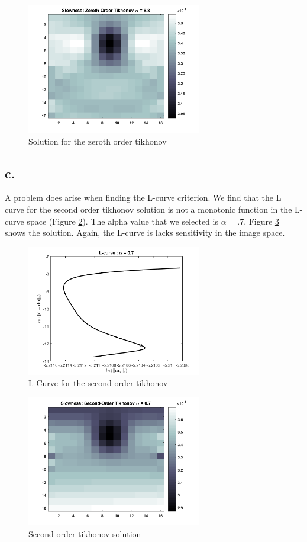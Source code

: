 \documentclass{article}
\begin{document}
\begin{figure}[!h]
    \centering
    \includegraphics[width=3in]{3b2.png}
    \caption{Solution for the zeroth order tikhonov}
    \label{3b2}
\end{figure}

\FloatBarrier

\subsection*{c.}
A problem does arise when finding the L-curve criterion. We find that the L curve for the second order tikhonov solution is not a monotonic function in the L-curve space (Figure \ref{3c1}). The alpha value that we selected is $\alpha = .7$. Figure \ref{3c2} shows the solution. Again, the L-curve is lacks sensitivity in the image space.

\begin{figure}[!h]
    \centering
    \includegraphics[width=3in]{3c1.png}
    \caption{L Curve for the second order tikhonov}
    \label{3c1}
\end{figure}

\begin{figure}[!h]
    \centering
    \includegraphics[width=3in]{3c2.png}
    \caption{Second order tikhonov solution}
    \label{3c2}
\end{figure}
\end{document}

